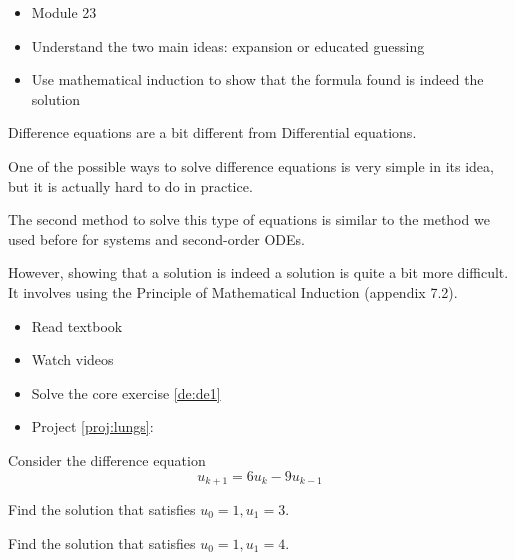 \begin{lesson}

	\begin{itemize}
		\item Module 23
	\end{itemize}

	\begin{itemize}
		\item Understand the two main ideas: expansion or educated guessing
		\item Use mathematical induction to show that the formula found is indeed the solution
	\end{itemize}
	


Difference equations are a bit different from Differential equations.

One of the possible ways to solve difference equations is very simple in its idea, but it is actually hard to do in practice.

The second method to solve this type of equations is similar to the method we used before for systems and second-order ODEs.

However, showing that a solution is indeed a solution is quite a bit more difficult. It involves using the Principle of Mathematical Induction (appendix 7.2).

\begin{itemize}
	\item Read textbook
	\item Watch videos
	\item Solve the core exercise \ref{de:de1}
\end{itemize}

\begin{itemize}
	\item Project \ref{proj:lungs}: \lungstitle
\end{itemize}



\end{lesson}





\question \label{de:de1}
	Consider the difference equation
	$$	u_{k+1} = 6 u_k - 9u_{k-1}	$$
	
\begin{parts}
	\item Find the solution that satisfies $u_0 = 1, u_1 = 3	$.
	\item Find the solution that satisfies $u_0 = 1, u_1 = 4$.
\end{parts}



